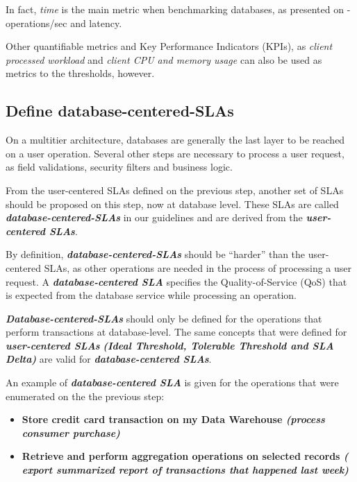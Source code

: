 In fact, \textit{time} is the main metric when benchmarking databases, as presented on \cite{datastaxbenchmark} - operations/sec and latency. 

Other quantifiable metrics and Key Performance Indicators (KPIs), as \textit{ client processed workload} and \textit{client CPU and memory usage} can also be used as metrics to the thresholds, however. 


\subsection{Define database-centered-SLAs}

On a multitier architecture, databases are generally the last layer to be reached on a user operation. Several other steps are necessary to process a user request, as field validations, security filters and business logic.

From the user-centered SLAs defined on the previous step, another set of SLAs should be proposed on this step, now at database level. These SLAs are called \textbf{\textit{database-centered-SLAs}} in our guidelines and are derived from the \textbf{\textit{user-centered SLAs}}.

By definition, \textbf{\textit{database-centered-SLAs}} should be ``harder'' than the user-centered SLAs, as other operations are needed in the process of processing a user request. A \textbf{\textit{database-centered SLA}} specifies the Quality-of-Service (QoS) that is expected from the database service while processing an operation.

\textbf{ \textit{Database-centered-SLAs}} should only be defined for the operations that perform transactions at database-level. The same concepts that were defined for \textbf{\textit{user-centered SLAs}} \textbf{\textit{(Ideal Threshold, Tolerable Threshold and SLA Delta)}} are valid for \textbf{\textit{database-centered SLAs}}.

An example of \textbf{\textit{database-centered SLA}} is given for the operations that were enumerated on the the previous step: 

\begin{itemize}
\item{ 
\textbf{Store credit card transaction on my Data Warehouse \textit{(process consumer purchase)}}
}

\item{
\textbf{Retrieve and perform aggregation operations on selected records \textit{( export summarized report of transactions that happened last week)}}
}
\end{itemize}

